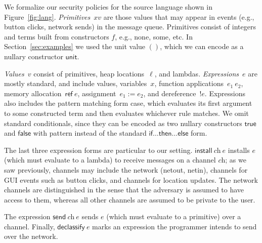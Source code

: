 \documentclass[conference]{IEEEtran}
\theoremstyle{definition}
\newcommand{\sfmt}[1]{\textsf{#1}}
\newcommand{\sch}{\textit{ch}}
\newcommand{\loc}{\ell}
\newcommand{\sassign}[2]{#1 := #2}
\newcommand{\sderef}[1]{!#1}
\newcommand{\sfalse}{\sfmt{false}}
\newcommand{\sinstall}[2]{\sfmt{install}~#1~#2}
\newcommand{\sdeclassify}[1]{\sfmt{declassify}~#1}
\newcommand{\sref}[1]{\sfmt{ref}~#1}
\newcommand{\ssend}[2]{\sfmt{send}~#1~#2}
\newcommand{\strue}{\sfmt{true}}
\newcommand{\sunit}{\sfmt{unit}}
\begin{document}
We formalize our security policies for the source language shown in
Figure~\ref{fig:lang}. \emph{Primitives}~$xv$ are those values that
may appear in events (e.g., button clicks, network sends) in the
message queue. Primitives consist of integers and terms built from
constructors $f$, e.g., \sfmt{none}, \sfmt{some}, etc. In
Section~\ref{sec:examples} we used the unit value $()$, which we can
encode as a nullary constructor $\sunit$.

\emph{Values}~$v$ consist of primitives, heap locations~$\loc$, and
lambdas. \emph{Expressions}~$e$ are mostly standard, and include
values, variables~$x$, function applications~$e_1~e_2$, memory
allocation~$\sref{e}$, assignment~$\sassign{e_1}{e_2}$, and
dereference~$\sderef{e}$.  Expressions also includes the pattern
matching form \sfmt{case}, which evaluates its first argument to some
constructed term and then evaluates whichever rule matches. We omit
standard conditionals, since they can be encoded as two nullary
constructors $\strue$ and $\sfalse$ with pattern instead of the
standard $\sfmt{if}\ldots\sfmt{then}\ldots\sfmt{else}$ form.

The last three expression forms are particular to our
setting. $\sinstall{\sch}{e}$ installs $e$ (which must evaluate to a
lambda) to receive messages on a channel $\sch$; as we saw
previously, channels may include the network (\sfmt{netout},
\sfmt{netin}), channels for GUI events such as button clicks, and
channels for location updates. The network channels are distinguished
in the sense that the adversary is assumed to have access to them,
whereas all other channels are assumed to be private to the user.

The expression $\ssend{\sch}{e}$ sends $e$ (which must evaluate to a
primitive) over a channel. Finally, $\sdeclassify{e}$ marks an
expression the programmer intends to send over the network.
\end{document}
